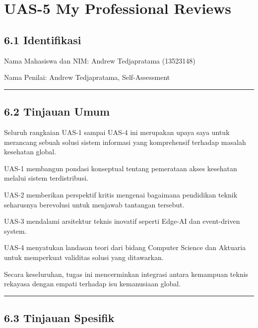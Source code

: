 \documentclass[
  letterpaper,
  DIV=11,
  numbers=noendperiod]{scrreprt}
\begin{document}

\chapter{UAS-5 My Professional
Reviews}\label{uas-5-my-professional-reviews}

\section{6.1 Identifikasi}\label{identifikasi-1}

Nama Mahasiswa dan NIM: Andrew Tedjapratama (13523148)

Nama Penilai: Andrew Tedjapratama, Self-Assessment

\begin{center}\rule{0.5\linewidth}{0.5pt}\end{center}

\section{6.2 Tinjauan Umum}\label{tinjauan-umum-1}

Seluruh rangkaian UAS-1 sampai UAS-4 ini merupakan upaya saya untuk
merancang sebuah solusi sistem informasi yang komprehensif terhadap
masalah kesehatan global.

UAS-1 membangun pondasi konseptual tentang pemerataan akses kesehatan
melalui sistem terdistribusi.

UAS-2 memberikan perspektif kritis mengenai bagaimana pendidikan teknik
seharusnya berevolusi untuk menjawab tantangan tersebut.

UAS-3 mendalami arsitektur teknis inovatif seperti Edge-AI dan
event-driven system.

UAS-4 menyatukan landasan teori dari bidang Computer Science dan
Aktuaria untuk memperkuat validitas solusi yang ditawarkan.

Secara keseluruhan, tugas ini mencerminkan integrasi antara kemampuan
teknis rekayasa dengan empati terhadap isu kemanusiaan global.

\begin{center}\rule{0.5\linewidth}{0.5pt}\end{center}

\section{6.3 Tinjauan Spesifik}\label{tinjauan-spesifik-1}
\end{document}
